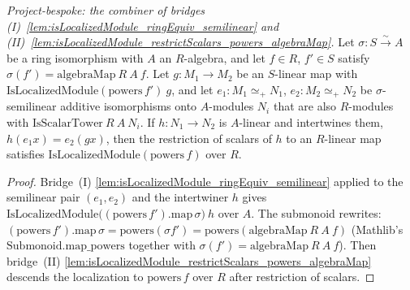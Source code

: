 \begin{lemma}
  \label{lem:isLocalizedModule_powers_transport}
  \textit{Project-bespoke: the combiner of bridges (I)~\cref{lem:isLocalizedModule_ringEquiv_semilinear}
  and (II)~\cref{lem:isLocalizedModule_restrictScalars_powers_algebraMap}.}
  Let \(\sigma : S \xrightarrow{\sim} A\) be a ring isomorphism with \(A\) an \(R\)-algebra, and let
  \(f \in R\), \(f' \in S\) satisfy \(\sigma(f') = \mathrm{algebraMap}\ R\ A\ f\). Let
  \(g : M_1 \to M_2\) be an \(S\)-linear map with \(\mathrm{IsLocalizedModule}(\mathrm{powers}\,f')\ g\),
  and let \(e_1 : M_1 \simeq_+ N_1\), \(e_2 : M_2 \simeq_+ N_2\) be \(\sigma\)-semilinear additive
  isomorphisms onto \(A\)-modules \(N_i\) that are also \(R\)-modules with
  \(\mathrm{IsScalarTower}\ R\ A\ N_i\). If \(h : N_1 \to N_2\) is \(A\)-linear and intertwines them,
  \(h(e_1 x) = e_2(g x)\), then the restriction of scalars of \(h\) to an \(R\)-linear map satisfies
  \(\mathrm{IsLocalizedModule}(\mathrm{powers}\,f)\) over \(R\).
\end{lemma}
\begin{proof}
  Bridge~(I) \cref{lem:isLocalizedModule_ringEquiv_semilinear} applied to the semilinear pair
  \((e_1, e_2)\) and the intertwiner \(h\) gives
  \(\mathrm{IsLocalizedModule}\bigl((\mathrm{powers}\,f').\mathrm{map}\,\sigma\bigr)\ h\) over \(A\). The
  submonoid rewrites: \((\mathrm{powers}\,f').\mathrm{map}\,\sigma = \mathrm{powers}(\sigma f') =
  \mathrm{powers}(\mathrm{algebraMap}\ R\ A\ f)\) (Mathlib's \(\mathrm{Submonoid.map\_powers}\) together
  with \(\sigma(f') = \mathrm{algebraMap}\ R\ A\ f\)). Then bridge~(II)
  \cref{lem:isLocalizedModule_restrictScalars_powers_algebraMap} descends the localization to
  \(\mathrm{powers}\,f\) over \(R\) after restriction of scalars.
\end{proof}


